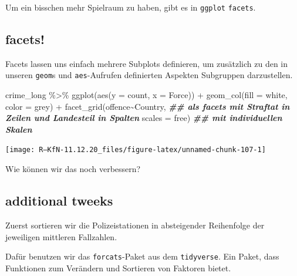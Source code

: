 \documentclass[
]{book}
\newenvironment{Shaded}{\begin{snugshade}}{\end{snugshade}}
\newcommand{\AttributeTok}[1]{\textcolor[rgb]{0.77,0.63,0.00}{#1}}
\newcommand{\DocumentationTok}[1]{\textcolor[rgb]{0.56,0.35,0.01}{\textbf{\textit{#1}}}}
\newcommand{\FunctionTok}[1]{\textcolor[rgb]{0.00,0.00,0.00}{#1}}
\newcommand{\NormalTok}[1]{#1}
\newcommand{\SpecialCharTok}[1]{\textcolor[rgb]{0.00,0.00,0.00}{#1}}
\newcommand{\StringTok}[1]{\textcolor[rgb]{0.31,0.60,0.02}{#1}}
\begin{document}
Um ein bisschen mehr Spielraum zu haben, gibt es in \texttt{ggplot} \texttt{facets}.

\hypertarget{facets}{%
\subsection{facets!}\label{facets}}

Facets lassen uns einfach mehrere Subplots definieren, um zusätzlich zu den in unseren \texttt{geom}s und \texttt{aes}-Aufrufen definierten Aspekten Subgruppen darzustellen.

\begin{Shaded}
\begin{Highlighting}[]
\NormalTok{crime\_long }\SpecialCharTok{\%\textgreater{}\%}  
  \FunctionTok{ggplot}\NormalTok{(}\FunctionTok{aes}\NormalTok{(}\AttributeTok{y =}\NormalTok{ count,}
             \AttributeTok{x =}\NormalTok{ Force)) }\SpecialCharTok{+}
  \FunctionTok{geom\_col}\NormalTok{(}\AttributeTok{fill =} \StringTok{\textquotesingle{}white\textquotesingle{}}\NormalTok{,}
           \AttributeTok{color =} \StringTok{\textquotesingle{}grey\textquotesingle{}}\NormalTok{) }\SpecialCharTok{+}
  \FunctionTok{facet\_grid}\NormalTok{(offence}\SpecialCharTok{\textasciitilde{}}\NormalTok{Country, }\DocumentationTok{\#\# als facets mit Straftat in Zeilen und Landesteil in Spalten}
             \AttributeTok{scales =} \StringTok{\textquotesingle{}free\textquotesingle{}}\NormalTok{) }\DocumentationTok{\#\# mit individuellen Skalen}
\end{Highlighting}
\end{Shaded}

\begin{center}\texttt{[image: R---KfN-11.12.20\_files/figure-latex/unnamed-chunk-107-1]} \end{center}

Wie können wir das noch verbessern?

\hypertarget{additional-tweeks}{%
\subsection{additional tweeks}\label{additional-tweeks}}

Zuerst sortieren wir die Polizeistationen in absteigender Reihenfolge der jeweiligen mittleren Fallzahlen.

Dafür benutzen wir das \texttt{forcats}-Paket aus dem \texttt{tidyverse}. Ein Paket, dass Funktionen zum Verändern und Sortieren von Faktoren bietet.
\end{document}

